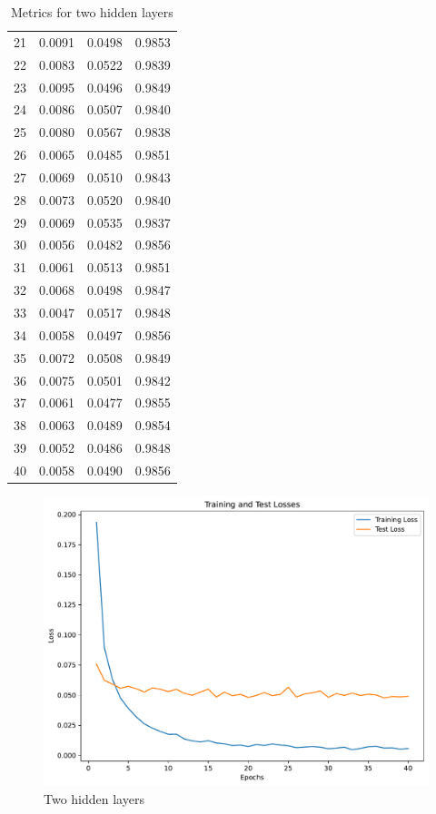 \documentclass[a4paper]{article}
\begin{document}
\begin{table}
\begin{center}
\begin{tabular}{ l|l|l|l }
    21 & 0.0091 & 0.0498 & 0.9853 \\
    22 & 0.0083 & 0.0522 & 0.9839 \\
    23 & 0.0095 & 0.0496 & 0.9849 \\
    24 & 0.0086 & 0.0507 & 0.9840 \\
    25 & 0.0080 & 0.0567 & 0.9838 \\
    26 & 0.0065 & 0.0485 & 0.9851 \\
    27 & 0.0069 & 0.0510 & 0.9843 \\
    28 & 0.0073 & 0.0520 & 0.9840 \\
    29 & 0.0069 & 0.0535 & 0.9837 \\
    30 & 0.0056 & 0.0482 & 0.9856 \\
    31 & 0.0061 & 0.0513 & 0.9851 \\
    32 & 0.0068 & 0.0498 & 0.9847 \\
    33 & 0.0047 & 0.0517 & 0.9848 \\
    34 & 0.0058 & 0.0497 & 0.9856 \\
    35 & 0.0072 & 0.0508 & 0.9849 \\
    36 & 0.0075 & 0.0501 & 0.9842 \\
    37 & 0.0061 & 0.0477 & 0.9855 \\
    38 & 0.0063 & 0.0489 & 0.9854 \\
    39 & 0.0052 & 0.0486 & 0.9848 \\
    40 & 0.0058 & 0.0490 & 0.9856 \\
  \end{tabular}
\end{center}
\caption{Metrics for two hidden layers}
  \label{tabular:two_hidden_layers_metrics}
\end{table}



\begin{figure}[H]
  \begin{center}
    \includegraphics[width=\textwidth]{ola/two_hidden_layer.pdf}
    \caption{Two hidden layers}
    \label{fig:two_hidden_layers}
  \end{center}
\end{figure}
\end{document}
